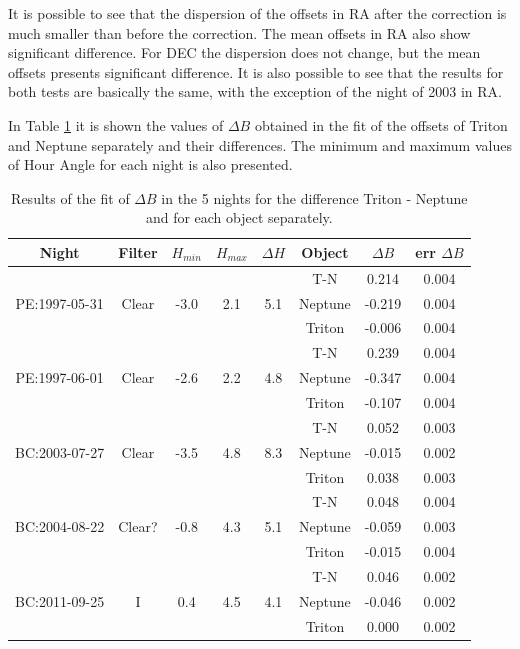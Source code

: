 \documentclass[12pt,a4paper]{report}
\begin{document}
It is possible to see that the dispersion of the offsets in RA after the correction is much smaller than before the correction. The mean offsets in RA also show significant difference. For DEC the dispersion does not change, but the mean offsets presents significant difference. It is also possible to see that the results for both tests are basically the same, with the exception of the night of 2003 in RA.

In Table \ref{Tab:refraction-cor} it is shown the values of $\Delta B$ obtained in the fit of the offsets of Triton and Neptune separately and their differences. The minimum and maximum values of Hour Angle for each night is also presented.

\begin{table}[h]
\centering
\caption{Results of the fit of $\Delta B$ in the 5 nights for the difference Triton - Neptune and for each object separately.}
\label{Tab:refraction-cor}
\begin{tabular}{|c|c|c|c|c|c|c|c|}
\hline
 Night & Filter  & $H_{min}$ & $H_{max}$ & $\Delta H$ & Object & $\Delta B$ & err $\Delta B$\\
 \hline
 & &  & & & T-N  &     0.214  &  0.004   \\
 PE:1997-05-31 &   Clear & -3.0 & 2.1 & 5.1 & Neptune &   -0.219 &  0.004  \\
 & & & & & Triton &  -0.006  &  0.004 \\
\hline
 & & & & & T-N  &  0.239  &  0.004 \\
 PE:1997-06-01 & Clear & -2.6 & 2.2 & 4.8 & Neptune &   -0.347  &  0.004 \\
 & & & & & Triton &   -0.107  &   0.004  \\
\hline
 & & & & & T-N &   0.052 &   0.003  \\
BC:2003-07-27 & Clear & -3.5 & 4.8 & 8.3 & Neptune &   -0.015  &  0.002  \\
 & & & & & Triton &    0.038  &  0.003  \\
\hline
 & & & & & T-N &   0.048  &  0.004  \\
BC:2004-08-22 & Clear? & -0.8 & 4.3 & 5.1 & Neptune &   -0.059  &   0.003  \\
 & & & & & Triton &   -0.015  &  0.004 \\
\hline
& & & & & T-N &   0.046  &  0.002  \\
BC:2011-09-25 & I & 0.4 & 4.5 & 4.1 & Neptune &   -0.046  &   0.002  \\
 & & & & & Triton &    0.000  &  0.002   \\
\hline
\end{tabular}
\end{table}
\end{document}
